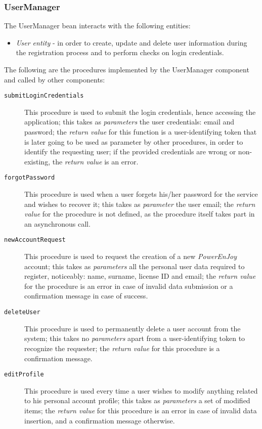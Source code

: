 \subsubsection{UserManager}
The UserManager bean interacts with the following entities:
\begin{itemize}
\item \textit{User entity} - in order to create, update and delete user information during the registration process and to perform checks on login credentials.
\end{itemize}

The following are the procedures implemented by the UserManager component and called by other components:
\begin{description}
\item[\texttt{submitLoginCredentials}] This procedure is used to submit the login credentials, hence accessing the application; this takes as \textit{parameters} the user credentials: email and password; the \textit{return value} for this function is a user-identifying token that is later going to be used as parameter by other procedures, in order to identify the requesting user; if the provided credentials are wrong or non-existing, the \textit{return value} is an error.
\item[\texttt{forgotPassword}] This procedure is used when a user forgets his/her password for the service and wishes to recover it; this takes as \textit{parameter} the user email; the \textit{return value} for the procedure is not defined, as the procedure itself takes part in an asynchronous call.
\item[\texttt{newAccountRequest}] This procedure is used to request the creation of a new \textit{PowerEnJoy} account; this takes as \textit{parameters} all the personal user data required to register, noticeably: name, surname, license ID and email; the \textit{return value} for the procedure is an error in case of invalid data submission or a confirmation message in case of success.
\item[\texttt{deleteUser}] This procedure is used to permanently delete a user account from the system; this takes no \textit{parameters} apart from a user-identifying token to recognize the requester; the \textit{return value} for this procedure is a confirmation message.
\item[\texttt{editProfile}] This procedure is used every time a user wishes to modify anything related to his personal account profile; this takes as \textit{parameters} a set of modified items; the \textit{return value} for this procedure is an error in case of invalid data insertion, and a confirmation message otherwise.

\end{description}

